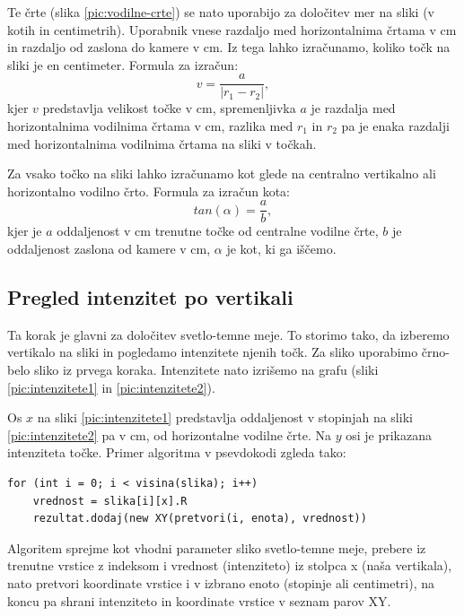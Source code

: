 \documentclass[oneside, a4paper, 12pt]{book}
\begin{document}
Te črte (slika \ref{pic:vodilne-crte}) se nato uporabijo za določitev mer na sliki (v kotih in centimetrih). Uporabnik vnese razdaljo med horizontalnima črtama v cm in razdaljo od zaslona do kamere v cm. Iz tega lahko izračunamo, koliko točk na sliki je en centimeter. Formula za izračun:
\begin{equation}
v=\dfrac{a}{|r_1-r_2|},
\end{equation}
kjer $v$ predstavlja velikost točke v cm, spremenljivka $a$ je razdalja med horizontalnima vodilnima črtama v cm, razlika med $r_1$ in $r_2$ pa je enaka razdalji med horizontalnima vodilnima črtama na sliki v točkah. 

Za vsako točko na sliki lahko izračunamo kot glede na centralno vertikalno ali horizontalno vodilno črto. Formula za izračun kota:
\begin{equation}
tan(\alpha)=\dfrac{a}{b},
\end{equation}
kjer je $a$ oddaljenost v cm trenutne točke od centralne vodilne črte, $b$ je oddaljenost zaslona od kamere v cm, $\alpha$ je kot, ki ga iščemo.

\subsection{Pregled intenzitet po vertikali}
Ta korak je glavni za določitev svetlo-temne meje. To storimo tako, da izberemo vertikalo na sliki in pogledamo intenzitete njenih točk. Za sliko uporabimo črno-belo sliko iz prvega koraka. Intenzitete nato izrišemo na grafu (sliki \ref{pic:intenzitete1} in \ref{pic:intenzitete2}).

Os $x$ na sliki \ref{pic:intenzitete1} predstavlja oddaljenost v stopinjah na sliki \ref{pic:intenzitete2} pa v cm, od horizontalne vodilne črte. Na $y$ osi je prikazana intenziteta točke. Primer algoritma v psevdokodi zgleda tako:
\begin{samepage}
\begin{verbatim}
for (int i = 0; i < visina(slika); i++)
    vrednost = slika[i][x].R
    rezultat.dodaj(new XY(pretvori(i, enota), vrednost))
\end{verbatim}
\end{samepage}
Algoritem sprejme kot vhodni parameter sliko svetlo-temne meje, prebere iz trenutne vrstice z indeksom i vrednost (intenziteto) iz stolpca x (naša vertikala), nato pretvori koordinate vrstice i v izbrano enoto (stopinje ali centimetri), na koncu pa shrani intenziteto in koordinate vrstice v seznam parov XY.
\end{document}
